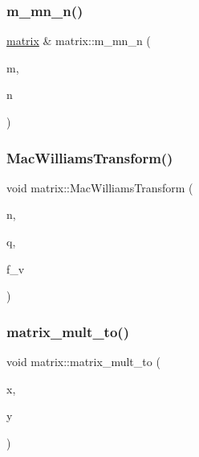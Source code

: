 \mbox{\label{classmatrix_ae9a8cf19bd93428639950725edbd2271}} 
\subsubsection{\texorpdfstring{m\+\_\+mn\+\_\+n()}{m\_mn\_n()}}
{\footnotesize\ttfamily \mbox{\hyperlink{classmatrix}{matrix}} \& matrix\+::m\+\_\+mn\+\_\+n (\begin{DoxyParamCaption}\item[{\mbox{\hyperlink{galois_8h_a09fddde158a3a20bd2dcadb609de11dc}{I\+NT}}}]{m,  }\item[{\mbox{\hyperlink{galois_8h_a09fddde158a3a20bd2dcadb609de11dc}{I\+NT}}}]{n }\end{DoxyParamCaption})}

\mbox{\label{classmatrix_a6165884e70a04d1bd608f0321ec12040}} 
\subsubsection{\texorpdfstring{Mac\+Williams\+Transform()}{MacWilliamsTransform()}}
{\footnotesize\ttfamily void matrix\+::\+Mac\+Williams\+Transform (\begin{DoxyParamCaption}\item[{\mbox{\hyperlink{galois_8h_a09fddde158a3a20bd2dcadb609de11dc}{I\+NT}}}]{n,  }\item[{\mbox{\hyperlink{galois_8h_a09fddde158a3a20bd2dcadb609de11dc}{I\+NT}}}]{q,  }\item[{\mbox{\hyperlink{galois_8h_a09fddde158a3a20bd2dcadb609de11dc}{I\+NT}}}]{f\+\_\+v }\end{DoxyParamCaption})}

\mbox{\label{classmatrix_a7b3866189e0d7f75e55805d6e9a43ace}} 
\subsubsection{\texorpdfstring{matrix\+\_\+mult\+\_\+to()}{matrix\_mult\_to()}}
{\footnotesize\ttfamily void matrix\+::matrix\+\_\+mult\+\_\+to (\begin{DoxyParamCaption}\item[{\mbox{\hyperlink{classmatrix}{matrix}} \&}]{x,  }\item[{\mbox{\hyperlink{classdiscreta__base}{discreta\+\_\+base}} \&}]{y }\end{DoxyParamCaption})}

